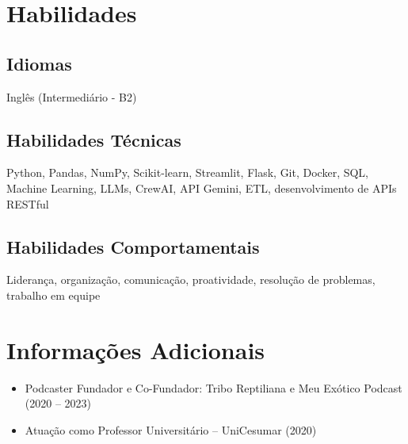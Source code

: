 \documentclass{article}
\begin{document}
\section*{Habilidades}

\subsection*{Idiomas}
Inglês (Intermediário - B2)

\subsection*{Habilidades Técnicas}
Python, Pandas, NumPy, Scikit-learn, Streamlit, Flask, Git, Docker, SQL, Machine Learning, LLMs, CrewAI, API Gemini, ETL, desenvolvimento de APIs RESTful

\subsection*{Habilidades Comportamentais}
Liderança, organização, comunicação, proatividade, resolução de problemas, trabalho em equipe

\section*{Informações Adicionais}

\begin{itemize}
    \item Podcaster Fundador e Co-Fundador: Tribo Reptiliana e Meu Exótico Podcast (2020 – 2023)
    \item Atuação como Professor Universitário – UniCesumar (2020)
\end{itemize}
\end{document}
